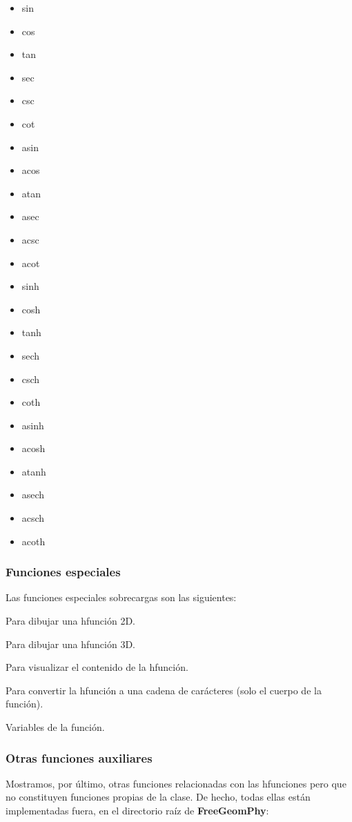 \documentclass{article}
\newcommand{\fgp}{\textbf{FreeGeomPhy}\xspace}
\begin{document}
\begin{multicols}{6}
  \begin{itemize}[font=\normalfont\ttfamily]
  \item sin
  \item cos
  \item tan
  \item sec
  \item csc
  \item cot
  \item asin
  \item acos
  \item atan
  \item asec
  \item acsc
  \item acot
  \item sinh
  \item cosh
  \item tanh
  \item sech
  \item csch
  \item coth
  \item asinh
  \item acosh
  \item atanh
  \item asech
  \item acsch
  \item acoth
  \end{itemize}
\end{multicols}

\subsubsection{Funciones especiales}
\label{sssec:spfuns}
Las funciones especiales sobrecargas son las siguientes:

\begin{description}[font=\normalfont\ttfamily]
  \item[plot] Para dibujar una hfunción 2D.
  \item[plot3] Para dibujar una hfunción 3D.
  \item[display] Para visualizar el contenido de la hfunción.
  \item[char] Para convertir la hfunción a una cadena de carácteres
    (solo el cuerpo de la función).
  \item[argnames] Variables de la función.
\end{description}

\subsubsection{Otras funciones auxiliares}
Mostramos, por último, otras funciones relacionadas con las hfunciones
pero que no constituyen funciones propias de la clase. De hecho, todas
ellas están implementadas fuera, en el directorio raíz de \fgp:
\end{document}
